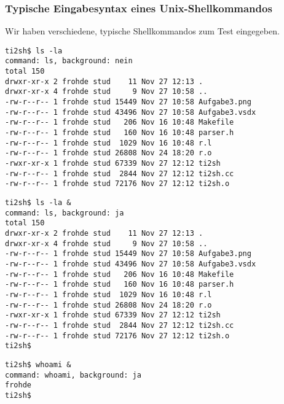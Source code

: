 
\subsubsection{Typische Eingabesyntax eines Unix-Shellkommandos}
Wir haben verschiedene, typische Shellkommandos zum Test eingegeben.

\begin{lstlisting}[numbers=none]
ti2sh$ ls -la
command: ls, background: nein
total 150
drwxr-xr-x 2 frohde stud    11 Nov 27 12:13 .
drwxr-xr-x 4 frohde stud     9 Nov 27 10:58 ..
-rw-r--r-- 1 frohde stud 15449 Nov 27 10:58 Aufgabe3.png
-rw-r--r-- 1 frohde stud 43496 Nov 27 10:58 Aufgabe3.vsdx
-rw-r--r-- 1 frohde stud   206 Nov 16 10:48 Makefile
-rw-r--r-- 1 frohde stud   160 Nov 16 10:48 parser.h
-rw-r--r-- 1 frohde stud  1029 Nov 16 10:48 r.l
-rw-r--r-- 1 frohde stud 26808 Nov 24 18:20 r.o
-rwxr-xr-x 1 frohde stud 67339 Nov 27 12:12 ti2sh
-rw-r--r-- 1 frohde stud  2844 Nov 27 12:12 ti2sh.cc
-rw-r--r-- 1 frohde stud 72176 Nov 27 12:12 ti2sh.o
\end{lstlisting}

\begin{lstlisting}[numbers=none]
ti2sh$ ls -la &
command: ls, background: ja
total 150
drwxr-xr-x 2 frohde stud    11 Nov 27 12:13 .
drwxr-xr-x 4 frohde stud     9 Nov 27 10:58 ..
-rw-r--r-- 1 frohde stud 15449 Nov 27 10:58 Aufgabe3.png
-rw-r--r-- 1 frohde stud 43496 Nov 27 10:58 Aufgabe3.vsdx
-rw-r--r-- 1 frohde stud   206 Nov 16 10:48 Makefile
-rw-r--r-- 1 frohde stud   160 Nov 16 10:48 parser.h
-rw-r--r-- 1 frohde stud  1029 Nov 16 10:48 r.l
-rw-r--r-- 1 frohde stud 26808 Nov 24 18:20 r.o
-rwxr-xr-x 1 frohde stud 67339 Nov 27 12:12 ti2sh
-rw-r--r-- 1 frohde stud  2844 Nov 27 12:12 ti2sh.cc
-rw-r--r-- 1 frohde stud 72176 Nov 27 12:12 ti2sh.o
ti2sh$
\end{lstlisting}

\begin{lstlisting}[numbers=none]
ti2sh$ whoami &
command: whoami, background: ja
frohde
ti2sh$
\end{lstlisting}

